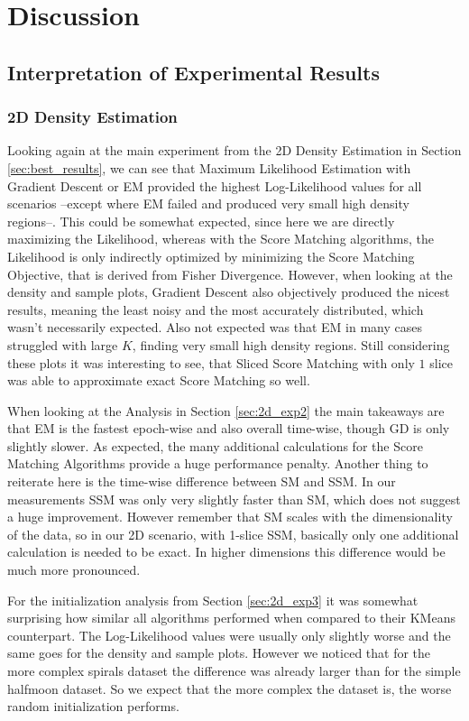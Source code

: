\chapter{Discussion}
\label{cha:discussion}

\section{Interpretation of Experimental Results}

\subsection{2D Density Estimation}

Looking again at the main experiment from the 2D Density Estimation in Section \ref{sec:best_results}, we can see that
Maximum Likelihood Estimation with Gradient Descent or EM provided the highest Log-Likelihood values for all scenarios --except where EM failed and produced very small high density regions--. 
This could be somewhat expected, since here we are directly maximizing the Likelihood, whereas with the Score Matching algorithms, the Likelihood
is only indirectly optimized by minimizing the Score Matching Objective, that is derived from Fisher Divergence. 
However, when looking at the density and sample plots, Gradient Descent also objectively produced the nicest results, meaning the least 
noisy and the most accurately distributed, which wasn't necessarily expected.  
Also not expected was that EM in many cases struggled with large $K$, finding very small high density regions.
Still considering these plots it was interesting to see, that Sliced Score Matching with only $1$ slice was able to approximate exact Score Matching so well.

When looking at the Analysis in Section \ref{sec:2d_exp2} the main takeaways are that EM is the fastest epoch-wise and also overall time-wise, 
though GD is only slightly slower. As expected, the many additional calculations for the Score Matching Algorithms provide a huge 
performance penalty. Another thing to reiterate here is the time-wise difference between SM and SSM. In our measurements
SSM was only very slightly faster than SM, which does not suggest a huge improvement. 
However remember that SM scales with the dimensionality of the data, so in our 2D scenario, with
1-slice SSM, basically only one additional calculation is needed to be exact. 
In higher dimensions this difference would be much more pronounced. 

For the initialization analysis from Section \ref{sec:2d_exp3} it was somewhat surprising how similar all algorithms performed when compared 
to their KMeans counterpart. The Log-Likelihood
values were usually only slightly worse and the same goes for the density and sample plots. However we noticed that for the more 
complex spirals dataset the difference was already larger than for the simple halfmoon dataset. So we expect that the more complex 
the dataset is, the worse random initialization performs.  


